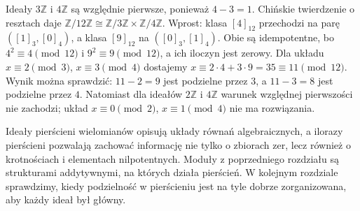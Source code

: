 \begin{przyklad}
\label{aa:prz:crt12}
Ideały $3\mathbb Z$ i $4\mathbb Z$ są względnie pierwsze,
ponieważ $4-3=1$. Chińskie twierdzenie o resztach daje
$\mathbb Z/12\mathbb Z\cong\mathbb Z/3\mathbb Z\times\mathbb Z/4\mathbb Z$.
Wprost: klasa $[4]_{12}$ przechodzi na parę $([1]_3,[0]_4)$,
a klasa $[9]_{12}$ na $([0]_3,[1]_4)$.
Obie są idempotentne, bo $4^2\equiv4\pmod{12}$ i
$9^2\equiv9\pmod{12}$, a ich iloczyn jest zerowy.
Dla układu $x\equiv2\pmod3$, $x\equiv3\pmod4$ dostajemy
$x\equiv 2\cdot4+3\cdot9=35\equiv11\pmod{12}$.
Wynik można sprawdzić: $11-2=9$ jest podzielne przez $3$,
a $11-3=8$ jest podzielne przez $4$.
Natomiast dla ideałów $2\mathbb Z$ i $4\mathbb Z$
warunek względnej pierwszości nie zachodzi; układ
$x\equiv0\pmod2$, $x\equiv1\pmod4$ nie ma rozwiązania.
\end{przyklad}

\begin{uwaga}
\label{aa:uw:ring-next}
Ideały pierścieni wielomianów opisują układy równań
algebraicznych, a ilorazy pierścieni pozwalają zachować
informację nie tylko o zbiorach zer, lecz również o krotnościach
i elementach nilpotentnych. Moduły z poprzedniego rozdziału
są strukturami addytywnymi, na których działa pierścień.
W kolejnym rozdziale sprawdzimy, kiedy podzielność w pierścieniu
jest na tyle dobrze zorganizowana, aby każdy ideał był główny.
\end{uwaga}

\setlength{\parskip}{4pt}
